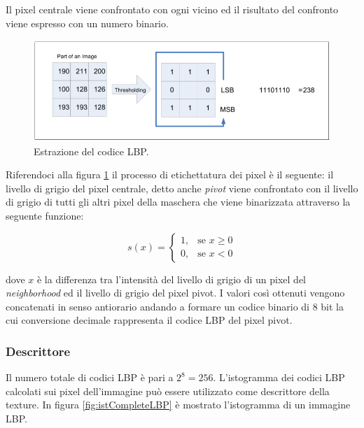  Il pixel centrale viene confrontato con ogni vicino ed il risultato del confronto viene espresso con un numero binario.\\

\begin{figure}[ht]
\begin{center}
\includegraphics[width=.95\textwidth]{img/LBP_code}
\caption{ Estrazione del codice LBP.}
\label{fig:LBPcode}
\end{center}
\end{figure}

Riferendoci alla figura \ref{fig:LBPcode} il processo di etichettatura dei pixel è il seguente:
il livello di grigio del pixel centrale, detto anche \emph{pivot} viene confrontato con il livello di grigio di tutti gli altri pixel della maschera che viene binarizzata attraverso la seguente funzione:

\begin{equation}
\label{eq:binarizzazione}
s(x) = 	\begin{cases} 1, & \mbox{se } x \ge 0 \\ 0, & \mbox{se } x < 0 \end{cases}
\end{equation}
\vspace{0.1cm}

\noindent dove $x$ è la differenza tra l'intensità del livello di grigio di un pixel del \emph{neighborhood} ed il livello di grigio del pixel pivot. I valori così ottenuti vengono concatenati in senso antiorario andando a formare un codice binario di 8 bit la cui conversione decimale rappresenta il codice \acs{LBP} del pixel pivot.

\subsubsection*{Descrittore}
Il numero totale di codici \acs{LBP} è pari a $2^8 = 256$.
L'istogramma dei codici LBP calcolati sui pixel dell'immagine può essere utilizzato come descrittore della texture. In figura \ref{fig:istCompleteLBP} è mostrato l'istogramma di un immagine LBP.

